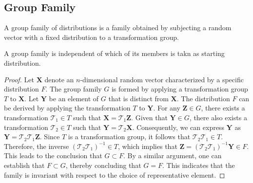 \subsection{Group Family}
\begin{definition}
	A group family of distributions is a family obtained by subjecting a random vector with a fixed distribution to a transformation group.
\end{definition}
\begin{property}
	A group family is independent of which of its members is takn as starting distribution.
\end{property}
\begin{proof}
	Let \(\mathbf{X}\) denote an \(n\)-dimensional random vector characterized by a specific distribution \(F\). The group family \(G\) is formed by applying a transformation group \(T\) to \(\mathbf{X}\). Let \(\mathbf{Y}\) be an element of \(G\) that is distinct from \(\mathbf{X}\). The distribution \(F\) can be derived by applying the transformation \(T\) to \(\mathbf{Y}\). For any \(\mathbf{Z} \in G\), there exists a transformation \(\mathcal{T}_1 \in T\) such that \(\mathbf{X} = \mathcal{T}_1 \mathbf{Z}\). Given that \(\mathbf{Y} \in G\), there also exists a transformation \(\mathcal{T}_2 \in T\) such that \(\mathbf{Y} = \mathcal{T}_2 \mathbf{X}\). Consequently, we can express \(\mathbf{Y}\) as \(\mathbf{Y} = \mathcal{T}_2 \mathcal{T}_1 \mathbf{Z}\). Since \(T\) is a transformation group, it follows that \(\mathcal{T}_2 \mathcal{T}_1 \in T\). Therefore, the inverse \((\mathcal{T}_2 \mathcal{T}_1)^{-1} \in T\), which implies that \(\mathbf{Z} = (\mathcal{T}_2 \mathcal{T}_1)^{-1} \mathbf{Y} \in F\). This leads to the conclusion that \(G \subset F\). By a similar argument, one can establish that \(F \subset G\), thereby concluding that \(G = F\). This indicates that the family is invariant with respect to the choice of representative element.
\end{proof}
